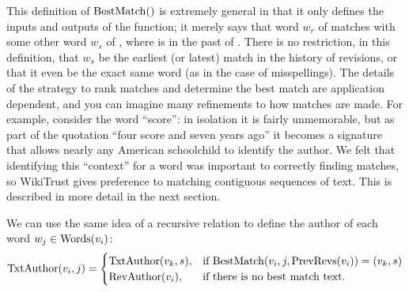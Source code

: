 This definition of $\mathrm{BestMatch}()$ is extremely general in that it only
defines the inputs and outputs of the function; it merely
says that word $w_r$ of  matches with some other word $w_s$
of , where  is in the past of .
There is no restriction, in this definition, that $w_s$ be the earliest
(or latest) match in the history of revisions, or that it even be
the exact same word (as in the case of misspellings).
The details of the strategy to rank matches and determine the best match
are application dependent, and you can imagine many refinements to how
matches are made.
For example, consider the word ``score'': in isolation it is fairly
unmemorable, but as part of the quotation ``four score and seven years
ago'' it becomes a signature that allows nearly any American
schoolchild to identify the author.
We felt that identifying this ``context'' for a word was important to
correctly finding matches, so WikiTrust gives preference to matching
contiguous sequences of text.
This is described in more detail in the next section.

We can use the same idea of a recursive relation to define
the author of each word $w_j \in \mathrm{Words}(v_{i})$:
\begin{equation}
\txtauthor{\version{i}, j} =
    \begin{cases}
	\txtauthor{\version{k}, s}, & \text{if }
	\match{\version{i}, j, \prevrevs{\version{i}}} = (\version{k}, s) \\
	\revauthor{\version{i}}, & \text{if there is no best match text. } \\
    \end{cases}
\label{def:txtauthor}
\end{equation}

